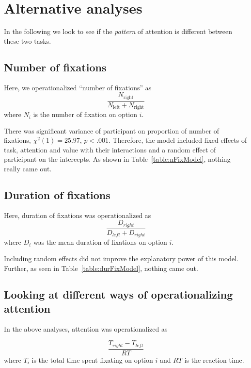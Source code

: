 \documentclass[12pt]{article}
\begin{document}
\clearpage
\newpage
\section{Alternative analyses}
In the following we look to see if the \emph{pattern} of attention is different between these two tasks. 

\subsection{Number of fixations}
Here, we operationalized ``number of fixations'' as 
\begin{equation}
	\frac{N_\text{right}}{N_\text{left}+N_\text{right}}
\end{equation}
where $N_i$ is the number of fixation on option $i$. 

There was significant variance of participant on proportion of number of fixations, $\chi^2(1)=25.97$, $p<.001$. Therefore, the model included fixed effects of task, attention and value with their interactions and a random effect of participant on the intercepts. As shown in Table~\ref{table:nFixModel}, nothing really came out. 





\clearpage
\subsection{Duration of fixations}
Here, duration of fixations was operationalized as 
\begin{equation}
	\frac{D_{right}}{D_{left} + D_{right}}
\end{equation}
where $D_i$ was the mean duration of fixations on option $i$. 

Including random effects did not improve the explanatory power of this model. Further, as seen in Table~\ref{table:durFixModel}, nothing came out. 



\clearpage
\newpage
\subsection{Looking at different ways of operationalizing attention}
In the above analyses, attention was operationalized as 

\begin{equation}
	\frac{T_{right}-T_{left}}{RT}	
\end{equation}
where $T_i$ is the total time spent fixating on option $i$ and $RT$ is the reaction time. 
\end{document}
